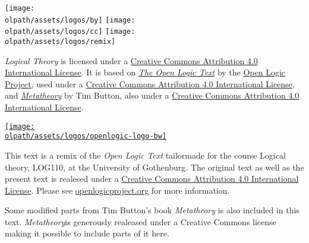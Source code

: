 \documentclass[a4paper]{memoir}
\newcommand{\olpath}{../../}
\begin{document}

\begin{titlingpage}

\vfill

\begin{minipage}[b]{.9cm}
\texttt{[image: \\olpath/assets/logos/by]}
\texttt{[image: \\olpath/assets/logos/cc]}
\texttt{[image: \\olpath/assets/logos/remix]}
\end{minipage}
\hspace{.3cm}
\begin{minipage}[b]{6.5cm}
\ollicensefont
\textit{Logical Theory} is licensed under a
\href{http://creativecommons.org/licenses/by/4.0/}{Creative Commons
  Attribution 4.0 International License}. It is based on
\textit{\href{https://github.com/OpenLogicProject/OpenLogic}{The Open
    Logic Text}} by the \href{http://openlogicproject.org/}{Open Logic
  Project}, used under a
\href{http://creativecommons.org/licenses/by/4.0/}{Creative Commons
  Attribution 4.0 International License}, and \textit{\href{http://people.ds.cam.ac.uk/tecb2/metatheory.shtml}{Metatheory}} by Tim Button, also under a \href{http://creativecommons.org/licenses/by/4.0/}{Creative Commons
  Attribution 4.0 International License}.
\end{minipage}
\hfill
\href{http://openlogicproject.org/}{\texttt{[image: \\olpath/assets/logos/openlogic-logo-bw]}}


\end{titlingpage}

\frontmatter
\pagestyle{ruled}

\thispagestyle{empty}%
\noindent This text is a remix of the \textit{Open Logic Text} tailormade for the course Logical theory, LOG110, at the University of Gothenburg. The original text as well as the present text is realesed under a \href{http://creativecommons.org/licenses/by/4.0/}{Creative Commons
  Attribution 4.0 International License}. Please see \href{http://openlogicproject.org/}{openlogicproject.org} for
more information. 

Some modified parts from Tim Button's book \textit{Metatheory} is also included in this text. \textit{Metatheory}is generously realeased under a Creative Commons license making it possible to include parts of it here.
\end{document}
